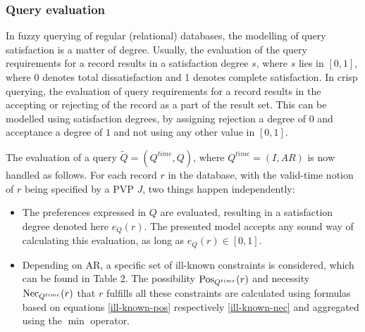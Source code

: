 \subsubsection{Query evaluation}
In fuzzy querying of regular (relational) databases, the modelling of query satisfaction is a matter of degree. Usually, the evaluation of the query requirements for a record results in a satisfaction degree $s$, where $s$ lies in $\left[0,1\right]$, where 0 denotes total dissatisfaction and 1 denotes complete satisfaction. In crisp querying, the evaluation of query requirements for a record results in the accepting or rejecting of the record as a part of the result set. This can be modelled using satisfaction degrees, by assigning rejection a degree of $0$ and acceptance a degree of $1$ and not using any other value in $\left[0,1\right]$.

The evaluation of a query $\tilde{Q} = \left( Q^{time}, Q \right)$, where $Q^{time} = \left( I, AR \right)$ is now handled as follows. For each record $r$ in the database, with the valid-time notion of $r$ being specified by a PVP $J$, two things happen independently:



\begin{itemize}
\item
The preferences expressed in $Q$ are evaluated, resulting in a satisfaction degree denoted here $e_{Q}(r)$. The presented model accepts any sound way of calculating this evaluation, as long as $e_{Q}(r) \in \left[0,1\right]$. 
\item
Depending on AR, a specific set of ill-known constraints is considered, which can be found in Table 2. The possibility $\operatorname{Pos}_{Q^{time}}(r)$ and necessity $\operatorname{Nec}_{Q^{time}}(r)$ that $r$ fulfills all these constraints are calculated using formulas based on equations \eqref{ill-known-pos} respectively \eqref{ill-known-nec} and aggregated using the $\min$ operator. 


\end{itemize}


